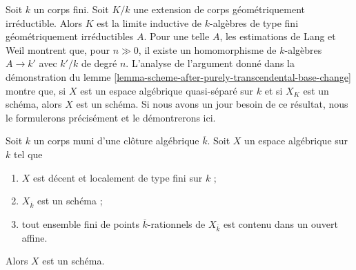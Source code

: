 \begin{remark}
\label{remark-when-does-the-argument-work}
Soit $k$ un corps fini. Soit $K/k$ une extension de corps géométriquement
irréductible. Alors $K$ est la limite inductive de $k$-algèbres de type fini
géométriquement irréductibles $A$. Pour une telle $A$, les estimations
de Lang et Weil \cite{LW} montrent que, pour $n \gg 0$, il existe
un homomorphisme de $k$-algèbres $A \to k'$ avec $k'/k$ de degré $n$.
L'analyse de l'argument donné dans la démonstration du
lemme \ref{lemma-scheme-after-purely-transcendental-base-change}
montre que, si $X$ est un espace algébrique quasi-séparé sur $k$
et si $X_K$ est un schéma, alors $X$ est un schéma. Si nous avons un jour besoin de ce
résultat, nous le formulerons précisément et le démontrerons ici.
\end{remark}

\begin{lemma}
\label{lemma-scheme-over-algebraic-closure-enough-affines}
Soit $k$ un corps muni d'une clôture algébrique $\overline{k}$. Soit $X$
un espace algébrique sur $k$ tel que
\begin{enumerate}
\item $X$ est décent et localement de type fini sur $k$ ;
\item $X_{\overline{k}}$ est un schéma ;
\item tout ensemble fini de points $\overline{k}$-rationnels de $X_{\overline{k}}$
est contenu dans un ouvert affine.
\end{enumerate}
Alors $X$ est un schéma.
\end{lemma}

